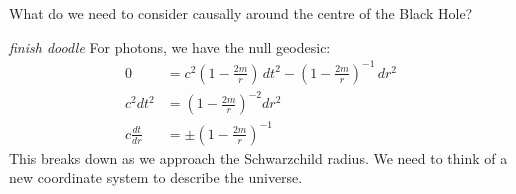 \documentclass[a4paper, 11pt, normalem]{report}
\begin{document}
What do we need to consider causally around the centre of the Black Hole?
\begin{figure}[H]
    \centering
\end{figure}
\emph{finish doodle}
For photons, we have the null geodesic:
\begin{align}
    0 &= c^2\left(1-\frac{2m}{r}\right)\,dt^2 - \left(1-\frac{2m}{r}\right)^{-1}\,dr^2 \\
    c^2dt^2 &= \left(1-\frac{2m}{r}\right)^{-2}dr^2 \\
    c\frac{dt}{dr} &= \pm \left(1-\frac{2m}{r}\right)^{-1}
\end{align}
This breaks down as we approach the Schwarzchild radius.
We need to think of a new coordinate system to describe the universe. 
\end{document}

